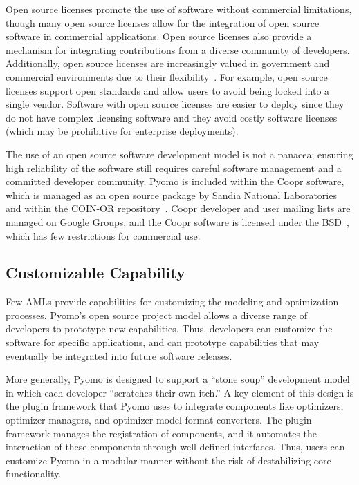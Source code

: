 Open source licenses promote the use of software without commercial
limitations, though many open source licenses allow for the integration
of open source software in commercial applications.  Open source
licenses also provide a mechanism for integrating contributions from a
diverse community of developers.  Additionally, open source licenses are
increasingly valued in government and commercial environments due to their
flexibility~\cite{Forrester}.  For example, open source licenses support
open standards and allow users to avoid being locked into a single vendor.
Software with open source licenses are easier to deploy since they do not
have complex licensing software and they avoid costly software licenses
(which may be prohibitive for enterprise deployments).

The use of an open source software development model is not a panacea;
ensuring high reliability of the software still requires careful software
management and a committed developer community.  Pyomo is included
within the Coopr software, which is managed as an open source package
by Sandia National Laboratories~\cite{Coopr} and within the COIN-OR
repository~\citep{COINOR}.  Coopr developer and user mailing lists are
managed on Google Groups, and the Coopr software is licensed under the
BSD~\citep{BSD}, which has few restrictions for commercial use.


\subsection{Customizable Capability}

Few AMLs provide capabilities for customizing the modeling
and optimization processes.  Pyomo's open source project model allows
a diverse range of developers to prototype new capabilities.  Thus,
developers can customize the software for specific applications, and
can prototype capabilities that may eventually be integrated into future
software releases.

More generally, Pyomo is designed to support a ``stone soup'' development
model in which each developer ``scratches their own itch.'' A key element
of this design is the plugin framework that Pyomo uses to integrate
components like optimizers, optimizer managers, and optimizer model
format converters.  The plugin framework manages the registration of
components, and it automates the interaction of these components through
well-defined interfaces.  Thus, users can customize Pyomo in a modular
manner without the risk of destabilizing core functionality.

